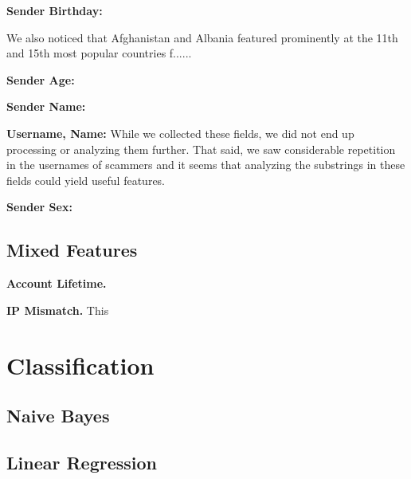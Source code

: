 \documentclass[preprint]{acm_proc_article-sp}
\begin{document}
\textbf{Sender Birthday:}

We also noticed that Afghanistan and Albania featured prominently at the 11th and 15th most popular countries f......

\textbf{Sender Age:}

\textbf{Sender Name:}



\textbf{Username, Name:} While we collected these fields, we did not end up processing or analyzing them further. That said, we saw considerable repetition in the usernames of scammers and it seems that analyzing the substrings in these fields could yield useful features.

\textbf{Sender Sex:}

\subsection{Mixed Features}

\textbf{Account Lifetime.}

\textbf{IP Mismatch.} This 




\section{Classification}

\subsection{Naive Bayes}

%
%
\subsection{Linear Regression}
\end{document}
